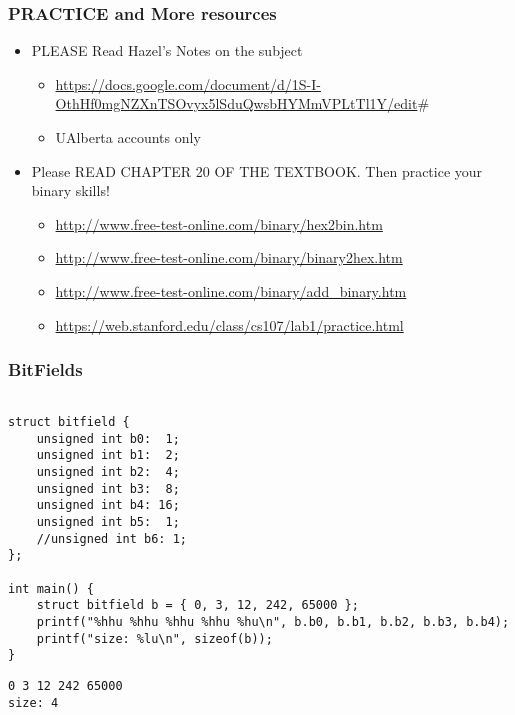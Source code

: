\documentclass[11pt]{article}
\begin{document}
\subsubsection{PRACTICE and More resources}
\label{sec:org24d3fd4}

\begin{itemize}
\item PLEASE Read Hazel's Notes on the subject 
\begin{itemize}
\item \url{https://docs.google.com/document/d/1S-I-OthHf0mgNZXnTSOvyx5lSduQwsbHYMmVPLtTl1Y/edit}\#
\item UAlberta accounts only
\end{itemize}

\item Please READ CHAPTER 20 OF THE TEXTBOOK. Then practice your binary skills!
\begin{itemize}
\item \url{http://www.free-test-online.com/binary/hex2bin.htm}
\item \url{http://www.free-test-online.com/binary/binary2hex.htm}
\item \url{http://www.free-test-online.com/binary/add\_binary.htm}
\item \url{https://web.stanford.edu/class/cs107/lab1/practice.html}
\end{itemize}
\end{itemize}


\subsubsection{BitFields}
\label{sec:org8e338cb}

\begin{verbatim}

struct bitfield {
    unsigned int b0:  1;
    unsigned int b1:  2;
    unsigned int b2:  4;
    unsigned int b3:  8;
    unsigned int b4: 16;
    unsigned int b5:  1;
    //unsigned int b6: 1;
};

int main() {
    struct bitfield b = { 0, 3, 12, 242, 65000 };
    printf("%hhu %hhu %hhu %hhu %hu\n", b.b0, b.b1, b.b2, b.b3, b.b4);
    printf("size: %lu\n", sizeof(b));
}

\end{verbatim}

\begin{verbatim}
0 3 12 242 65000
size: 4
\end{verbatim}
\end{document}
